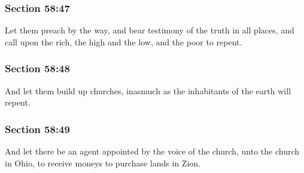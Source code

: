 	\subsubsection{Section 58:47} %
		\label{DC58-47}

		Let them preach by the way, and bear testimony of the truth in all places, and call upon the rich, the high and the low, and the poor to repent.


	\subsubsection{Section 58:48} %
		\label{DC58-48}

		And let them build up churches, inasmuch as the inhabitants of the earth will repent.


	\subsubsection{Section 58:49} %
		\label{DC58-49}

		And let there be an agent appointed by the voice of the church, unto the church in Ohio, to receive moneys to purchase lands in Zion.



